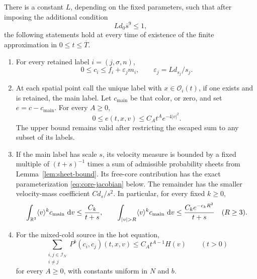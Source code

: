 \begin{proposition}
\label{prop:cold-control}
There is a constant \(L\), depending on the fixed parameters, such
that after imposing the additional condition
\begin{equation}
 Ld_0\overline s^9\le1,
 \label{jet:thermal-comparison}
\end{equation}
the following statements hold at every time of existence of the
finite approximation in \(0\le t\le\overline T\).
\begin{enumerate}[label=\textup{(\roman*)}]
 \item For every retained label \(i=(j,\sigma,n)\),
 \begin{equation}
  0\le c_i\le f_i+\varepsilon_j m_i,\qquad
  \varepsilon_j=Ld_{s_j}/s_j .
  \label{jet:cold-remainder}
 \end{equation}
 \item At each spatial point call the unique label with
 \(x\in\mathcal O_i(t)\), if one exists and is retained, the main
 label.  Let \(c_{\mathrm{main}}\) be that color, or zero, and set
 \(e=c-c_{\mathrm{main}}\).  For every \(A\ge0\),
 \begin{equation}
  0\le e(t,x,v)\le C_A t^A e^{-4|v|^2}.
  \label{jet:escaped}
 \end{equation}
 The upper bound remains valid after restricting the escaped sum
 to any subset of its labels.
 \item If the main label has scale \(s\), its velocity measure is
 bounded by a fixed multiple of \((t+s)^{-1}\) times a sum of
 admissible probability sheets from Lemma~\ref{lem:sheet-bound}.
 Its free-core contribution has the exact parameterization
 \eqref{eq:core-jacobian} below.  The remainder has the smaller
 velocity-mass coefficient \(Cd_s/s^2\).
 In particular, for every fixed \(k\ge0\),
 \begin{equation}
  \int_{\R^3}\langle v\rangle^k c_{\mathrm{main}}\,\dd v
       \le\frac{C_k}{t+s},\qquad
  \int_{|v|>R}\langle v\rangle^k c_{\mathrm{main}}\,\dd v
       \le\frac{C_k e^{-c_kR^2}}{t+s}\quad(R\ge3).
  \label{jet:moment-envelope}
 \end{equation}
 \item For the mixed-cold source in the hot equation,
 \begin{equation}
  \sum_{\substack{i,j\in\mathcal I_N\\i\ne j}}
       P^b(c_i,c_j)(t,x,v)
       \le C_A t^{A-1}H(v)\qquad (t>0)
  \label{jet:mixed-source}
 \end{equation}
 for every \(A\ge0\), with constants uniform in \(N\) and \(b\).
\end{enumerate}
\end{proposition}

